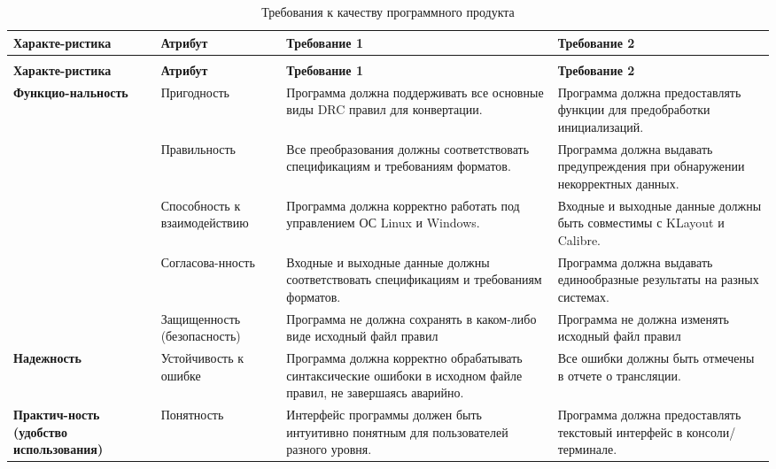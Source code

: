 \begin{longtable}{|p{3cm}|p{3cm}|p{5cm}|p{5cm}|}
	\caption{Требования к качеству программного продукта} \label{table} \\
	\hline
	\textbf{Характе-ристика}
	& \textbf{Атрибут}
	& \textbf{Требование 1}
	& \textbf{Требование 2} \\
	\hline
	\endfirsthead

	\conttable{table} \\
	\hline
	\textbf{Характе-ристика}
	& \textbf{Атрибут}
	& \textbf{Требование 1}
	& \textbf{Требование 2} \\
	\hline
	\endhead

	\textbf{Функцио-нальность}
	& Пригодность
	& Программа должна поддерживать
	все основные виды DRC правил для конвертации.
	& Программа должна предоставлять функции
	для предобработки инициализаций. \\ \hline

	& Правильность
	& Все преобразования должны соответствовать спецификациям
	и требованиям форматов.
	& Программа должна выдавать предупреждения
	при обнаружении некорректных данных. \\ \hline

	& Способность к взаимодействию
	& Программа должна корректно работать
	под управлением ОС Linux и Windows.
	& Входные и выходные данные должны быть совместимы
	с KLayout и Calibre. \\ \hline

	& Согласова-нность
	& Входные и выходные данные должны соответствовать спецификациям
	и требованиям форматов.
	& Программа должна выдавать единообразные результаты
	на разных системах. \\ \hline

	& Защищенность (безопасность)
	& Программа не должна сохранять в каком-либо виде исходный файл правил
	& Программа не должна изменять исходный файл правил \\ \hline

	\textbf{Надежность}
	& Устойчивость к ошибке
	& Программа должна корректно обрабатывать синтаксические ошибоки
	в исходном файле правил, не завершаясь аварийно.
	& Все ошибки должны быть отмечены в отчете о трансляции. \\ \hline

	\textbf{Практич-ность (удобство использования)}
	& Понятность
	& Интерфейс программы должен быть интуитивно понятным
	для пользователей разного уровня.
	& Программа должна предоставлять текстовый интерфейс
	в консоли/терминале. \\ \hline


\end{longtable}
